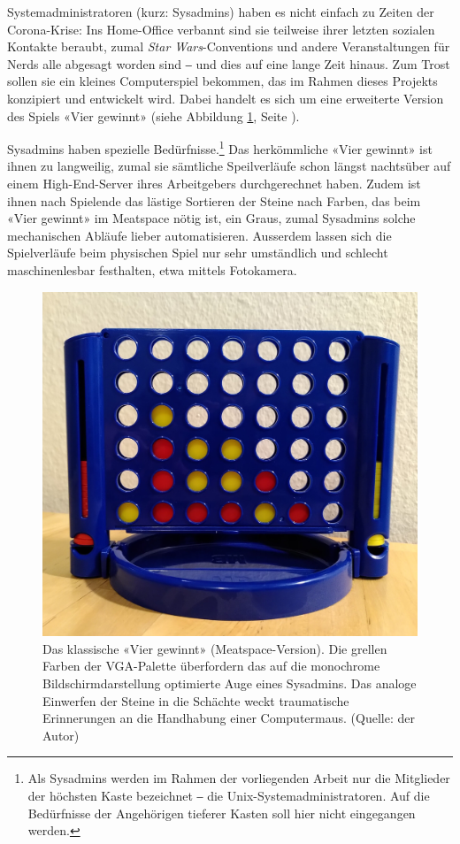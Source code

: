 \documentclass[a4paper,11pt,hidelinks]{scrartcl}
\newcommand{\imgref}[1]{{Abbildung \ref{#1}, Seite \pageref{#1}}}
\begin{document}
Systemadministratoren (kurz: Sysadmins) haben es nicht einfach zu Zeiten der Corona-Krise: Ins Home-Office verbannt sind sie teilweise ihrer letzten sozialen Kontakte beraubt, zumal \textit{Star Wars}-Conventions und andere Veranstaltungen für Nerds alle abgesagt worden sind ‒ und dies auf eine lange Zeit hinaus. Zum Trost sollen sie ein kleines Computerspiel bekommen, das im Rahmen dieses Projekts konzipiert und entwickelt wird. Dabei handelt es sich um eine erweiterte Version des Spiels «Vier gewinnt» (siehe \imgref{fig:vier-gewinnt}).

Sysadmins haben spezielle Bedürfnisse.\footnote{Als Sysadmins werden im Rahmen der vorliegenden Arbeit nur die Mitglieder der höchsten Kaste bezeichnet ‒ die Unix-Systemadministratoren. Auf die Bedürfnisse der Angehörigen tieferer Kasten soll hier nicht eingegangen werden.} Das herkömmliche «Vier gewinnt» ist ihnen zu langweilig, zumal sie sämtliche Speilverläufe schon längst nachtsüber auf einem High-End-Server ihres Arbeitgebers durchgerechnet haben. Zudem ist ihnen nach Spielende das lästige Sortieren der Steine nach Farben, das beim «Vier gewinnt» im Meatspace nötig ist, ein Graus, zumal Sysadmins solche mechanischen Abläufe lieber automatisieren. Ausserdem lassen sich die Spielverläufe beim physischen Spiel nur sehr umständlich und schlecht maschinenlesbar festhalten, etwa mittels Fotokamera.

\begin{figure}
    \centering
    \includegraphics[width=1.0\linewidth]{pics/vier-gewinnt.jpg}
    \caption{Das klassische «Vier gewinnt» (Meatspace-Version). Die grellen Farben der VGA-Palette überfordern das auf die monochrome Bildschirmdarstellung optimierte Auge eines Sysadmins. Das analoge Einwerfen der Steine in die Schächte weckt traumatische Erinnerungen an die Handhabung einer Computermaus. (Quelle: der Autor)}
    \label{fig:vier-gewinnt}
\end{figure}
\end{document}
